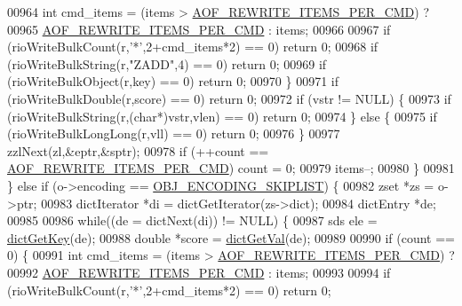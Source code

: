 \begin{DoxyCode}
{{{{{{{{{{{{{{{00964                 \textcolor{keywordtype}{int} cmd\_items = (items > \hyperlink{server_8h_a437bda3214c8acb2835f49eb68919507}{AOF\_REWRITE\_ITEMS\_PER\_CMD}) ?
00965                     \hyperlink{server_8h_a437bda3214c8acb2835f49eb68919507}{AOF\_REWRITE\_ITEMS\_PER\_CMD} : items;
00966 
00967                 \textcolor{keywordflow}{if} (rioWriteBulkCount(r,\textcolor{stringliteral}{'*'},2+cmd\_items*2) == 0) \textcolor{keywordflow}{return} 0;
00968                 \textcolor{keywordflow}{if} (rioWriteBulkString(r,\textcolor{stringliteral}{"ZADD"},4) == 0) \textcolor{keywordflow}{return} 0;
00969                 \textcolor{keywordflow}{if} (rioWriteBulkObject(r,key) == 0) \textcolor{keywordflow}{return} 0;
00970             \}
00971             \textcolor{keywordflow}{if} (rioWriteBulkDouble(r,score) == 0) \textcolor{keywordflow}{return} 0;
00972             \textcolor{keywordflow}{if} (vstr != NULL) \{
00973                 \textcolor{keywordflow}{if} (rioWriteBulkString(r,(\textcolor{keywordtype}{char}*)vstr,vlen) == 0) \textcolor{keywordflow}{return} 0;
00974             \} \textcolor{keywordflow}{else} \{
00975                 \textcolor{keywordflow}{if} (rioWriteBulkLongLong(r,vll) == 0) \textcolor{keywordflow}{return} 0;
00976             \}
00977             zzlNext(zl,&eptr,&sptr);
00978             \textcolor{keywordflow}{if} (++count == \hyperlink{server_8h_a437bda3214c8acb2835f49eb68919507}{AOF\_REWRITE\_ITEMS\_PER\_CMD}) count = 0;
00979             items--;
00980         \}
00981     \} \textcolor{keywordflow}{else} \textcolor{keywordflow}{if} (o->encoding == \hyperlink{server_8h_acfb35db5cb30ed113ed23aeb1a224c4c}{OBJ\_ENCODING\_SKIPLIST}) \{
00982         zset *zs = o->ptr;
00983         dictIterator *di = dictGetIterator(zs->dict);
00984         dictEntry *de;
00985 
00986         \textcolor{keywordflow}{while}((de = dictNext(di)) != NULL) \{
00987             sds ele = \hyperlink{dict_8h_a3271c334309904a3086deca94f96e46e}{dictGetKey}(de);
00988             \textcolor{keywordtype}{double} *score = \hyperlink{dict_8h_ae8d2cc391873b2bea2b87c4f80f43120}{dictGetVal}(de);
00989 
00990             \textcolor{keywordflow}{if} (count == 0) \{
00991                 \textcolor{keywordtype}{int} cmd\_items = (items > \hyperlink{server_8h_a437bda3214c8acb2835f49eb68919507}{AOF\_REWRITE\_ITEMS\_PER\_CMD}) ?
00992                     \hyperlink{server_8h_a437bda3214c8acb2835f49eb68919507}{AOF\_REWRITE\_ITEMS\_PER\_CMD} : items;
00993 
00994                 \textcolor{keywordflow}{if} (rioWriteBulkCount(r,\textcolor{stringliteral}{'*'},2+cmd\_items*2) == 0) \textcolor{keywordflow}{return} 0;
}}}}}}}}}}}}}}}
\end{DoxyCode}
